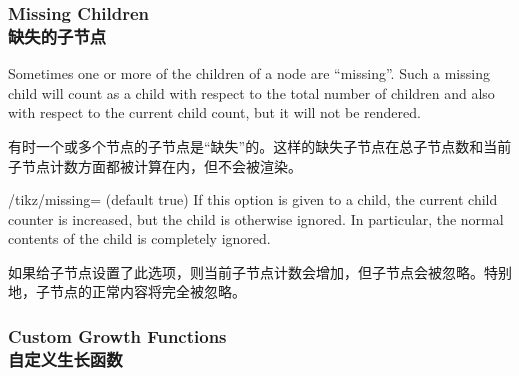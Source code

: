 \subsubsection{Missing Children\\缺失的子节点}

Sometimes one or more of the children of a node are ``missing''. Such a missing
child will count as a child with respect to the total number of children and
also with respect to the current child count, but it will not be rendered.

有时一个或多个节点的子节点是“缺失”的。这样的缺失子节点在总子节点数和当前子节点计数方面都被计算在内，但不会被渲染。

\begin{key}{/tikz/missing= (default true)}
    If this option is given to a child, the current child counter is increased,
    but the child is otherwise ignored. In particular, the normal contents of
    the child is completely ignored.
    
    如果给子节点设置了此选项，则当前子节点计数会增加，但子节点会被忽略。特别地，子节点的正常内容将完全被忽略。

    \begin{codeexample}[]
\end{codeexample}
    
\end{key}


\subsubsection{Custom Growth Functions\\自定义生长函数}

